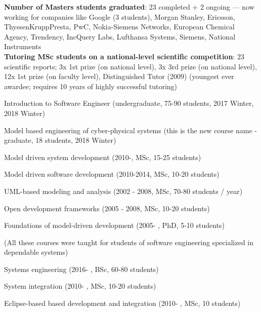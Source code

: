 \documentclass{xetexCV}
\begin{document}
\textbf{Number of Masters students graduated}: 23 completed + 2 ongoing --- now working for companies like
Google (3 students), Morgan Stanley, Ericsson, ThyssenKruppPresta, PwC, Nokia-Siemens Networks, European Chemical Agency, Trendency, IncQuery Labs, Lufthansa Systems, Siemens, National Instruments \\

\textbf{Tutoring MSc students on a national-level scientific competition}: 23
scientific reports; 3x 1st prize (on national level), 3x 3rd prize (on national
level), 12x 1st prize (on faculty level), %
Distinguished Tutor (2009) (youngest ever awardee; requires 10 years of
highly successful tutoring) \\


Introduction to Software Engineer (undergraduate, 75-90 students, 2017 Winter, 2018 Winter)

Model based engineering of cyber-physical systems (this is the new course name - graduate, 18 students, 2018 Winter)



Model driven system development (2010-, MSc, 15-25 students)

Model driven software development (2010-2014, MSc, 10-20 students)

UML-based modeling and analysis (2002 - 2008, MSc, 70-80 students / year)

Open development frameworks (2005 - 2008, MSc, 10-20 students)

Foundations of model-driven development (2005- , PhD, 5-10 students)

(All these courses were taught for students of software engineering specialized in dependable systems)


Systems engineering (2016- , BSc, 60-80 students)

System integration (2010- , MSc, 10-20 students)

Eclipse-based based development and integration (2010- , MSc, 10 students) 
\end{document}
